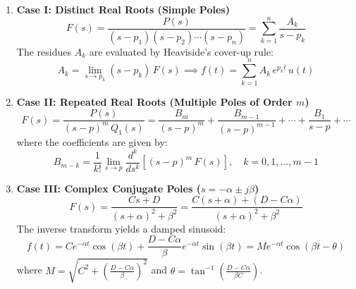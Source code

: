 \documentclass[12pt,a4paper]{article}
\begin{document}
\begin{tcolorbox}[defbox, title={\textbf{Three Cases of Partial Fraction Expansion}}]
\begin{enumerate}[leftmargin=*, itemsep=4pt]
  \item \textbf{Case I: Distinct Real Roots (Simple Poles)}
  \begin{equation}
    F(s) = \frac{P(s)}{(s - p_1)(s - p_2)\cdots(s - p_n)} = \sum_{k=1}^n \frac{A_k}{s - p_k}
  \end{equation}
  The residues $A_k$ are evaluated by Heaviside's cover-up rule:
  \begin{equation}
    A_k = \lim_{s \to p_k} (s - p_k)\,F(s) \implies f(t) = \sum_{k=1}^n A_k\,e^{p_k t}\,u(t)
  \end{equation}

  \item \textbf{Case II: Repeated Real Roots (Multiple Poles of Order $m$)}
  \begin{equation}
    F(s) = \frac{P(s)}{(s - p)^m\,Q_1(s)} = \frac{B_m}{(s - p)^m} + \frac{B_{m-1}}{(s - p)^{m-1}} + \cdots + \frac{B_1}{s - p} + \cdots
  \end{equation}
  where the coefficients are given by:
  \begin{equation}
    B_{m-k} = \frac{1}{k!}\lim_{s \to p} \frac{d^k}{ds^k} \left[(s - p)^m\,F(s)\right], \quad k = 0, 1, \dots, m-1
  \end{equation}

  \item \textbf{Case III: Complex Conjugate Poles ($s = -\alpha \pm j\beta$)}
  \begin{equation}
    F(s) = \frac{C s + D}{(s + \alpha)^2 + \beta^2} = \frac{C(s + \alpha) + (D - C\alpha)}{(s + \alpha)^2 + \beta^2}
  \end{equation}
  The inverse transform yields a damped sinusoid:
  \begin{equation}
    f(t) = C e^{-\alpha t}\cos(\beta t) + \frac{D - C\alpha}{\beta} e^{-\alpha t}\sin(\beta t) = M e^{-\alpha t}\cos(\beta t - \theta)
  \end{equation}
  where $M = \sqrt{C^2 + \left(\frac{D - C\alpha}{\beta}\right)^2}$ and $\theta = \tan^{-1}\left(\frac{D - C\alpha}{\beta C}\right)$.
\end{enumerate}
\end{tcolorbox}

\end{document}
